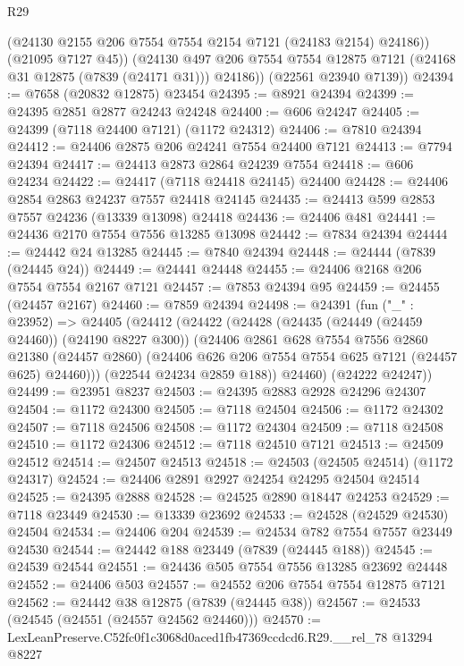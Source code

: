 \begin{lexlean}{R29}
\begin{coremodule}
            (@24130 @2155 @206 @7554 @7554 @2154 @7121 (@24183 @2154) @24186))
          (@21095 @7127 @45))
        (@24130 @497 @206 @7554 @7554 @12875 @7121 (@24168 @31 @12875 (@7839 (@24171 @31))) @24186))
      (@22561 @23940 @7139))
@24394 := @7658 (@20832 @12875) @23454
@24395 := @8921 @24394
@24399 := @24395 @2851 @2877 @24243 @24248
@24400 := @606 @24247
@24405 := @24399 (@7118 @24400 @7121) (@1172 @24312)
@24406 := @7810 @24394
@24412 := @24406 @2875 @206 @24241 @7554 @24400 @7121
@24413 := @7794 @24394
@24417 := @24413 @2873 @2864 @24239 @7554
@24418 := @606 @24234
@24422 := @24417 (@7118 @24418 @24145) @24400
@24428 := @24406 @2854 @2863 @24237 @7557 @24418 @24145
@24435 := @24413 @599 @2853 @7557 @24236 (@13339 @13098) @24418
@24436 := @24406 @481
@24441 := @24436 @2170 @7554 @7556 @13285 @13098
@24442 := @7834 @24394
@24444 := @24442 @24 @13285
@24445 := @7840 @24394
@24448 := @24444 (@7839 (@24445 @24))
@24449 := @24441 @24448
@24455 := @24406 @2168 @206 @7554 @7554 @2167 @7121
@24457 := @7853 @24394 @95
@24459 := @24455 (@24457 @2167)
@24460 := @7859 @24394
@24498 := @24391
    (fun ("_" : @23952) =>
    @24405
      (@24412
        (@24422
          (@24428
            (@24435 (@24449 (@24459 @24460)) (@24190 @8227 @300))
            (@24406
              @2861
              @628
              @7554
              @7556
              @2860
              @21380
              (@24457 @2860)
              (@24406 @626 @206 @7554 @7554 @625 @7121 (@24457 @625) @24460)))
          (@22544 @24234 @2859 @188))
        @24460)
      (@24222 @24247))
@24499 := @23951 @8237
@24503 := @24395 @2883 @2928 @24296 @24307
@24504 := @1172 @24300
@24505 := @7118 @24504
@24506 := @1172 @24302
@24507 := @7118 @24506
@24508 := @1172 @24304
@24509 := @7118 @24508
@24510 := @1172 @24306
@24512 := @7118 @24510 @7121
@24513 := @24509 @24512
@24514 := @24507 @24513
@24518 := @24503 (@24505 @24514) (@1172 @24317)
@24524 := @24406 @2891 @2927 @24254 @24295 @24504 @24514
@24525 := @24395 @2888
@24528 := @24525 @2890 @18447 @24253
@24529 := @7118 @23449
@24530 := @13339 @23692
@24533 := @24528 (@24529 @24530) @24504
@24534 := @24406 @204
@24539 := @24534 @782 @7554 @7557 @23449 @24530
@24544 := @24442 @188 @23449 (@7839 (@24445 @188))
@24545 := @24539 @24544
@24551 := @24436 @505 @7554 @7556 @13285 @23692 @24448
@24552 := @24406 @503
@24557 := @24552 @206 @7554 @7554 @12875 @7121
@24562 := @24442 @38 @12875 (@7839 (@24445 @38))
@24567 := @24533 (@24545 (@24551 (@24557 @24562 @24460)))
@24570 := LexLeanPreserve.C52fc0f1c3068d0aced1fb47369ccdcd6.R29.__rel_78 @13294 @8227

\end{coremodule}
\end{lexlean}
